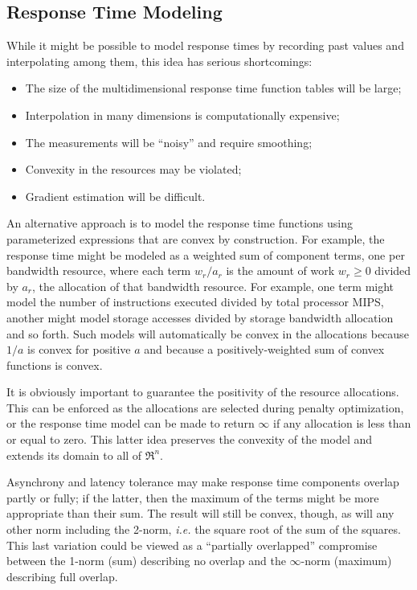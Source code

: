 \subsection*{Response Time Modeling}

While it might be possible to model response times by recording past values and interpolating among them,
this idea has serious shortcomings:
\begin{itemize}
\item The size of the multidimensional response time function tables will be large;
\item Interpolation in many dimensions is computationally expensive;
\item The measurements will be “noisy” and require smoothing;
\item Convexity in the resources may be violated;
\item Gradient estimation will be difficult.
\end{itemize}

An alternative approach is to model the response time functions using parameterized expressions that are convex by construction.
For example, the response time might be modeled as a weighted sum of component terms,
one per bandwidth resource, where each term $w_r/a_r$ is
the amount of work $w_r \geq 0$ divided by $a_r$, the allocation of that bandwidth resource\cite{Snav}.
For example,
one term might model the number of instructions executed divided by total processor MIPS,
another might model storage accesses divided by storage bandwidth allocation and so forth.
Such models will automatically be convex in the allocations because $1/a$ is convex for positive $a$
and because a positively-weighted sum of convex functions is convex.

It is obviously important to guarantee the positivity of the resource allocations.
This can be enforced as the allocations are selected during penalty optimization,
or the response time model can be made to return $\infty$ if any allocation is less than or equal to zero.
This latter idea preserves the convexity of the model and extends its domain to all of $\Re^n$.

Asynchrony and latency tolerance may make response time components overlap partly or fully;
if the latter, then the maximum of the terms might be more appropriate than their sum.
The result will still be convex, though, as will any other norm including the 2-norm,
\emph{i.e.} the square root of the sum of the squares.
This last variation could be viewed as a ``partially overlapped'' compromise between
the 1-norm (sum) describing no overlap and the $\infty$-norm (maximum) describing full overlap.

